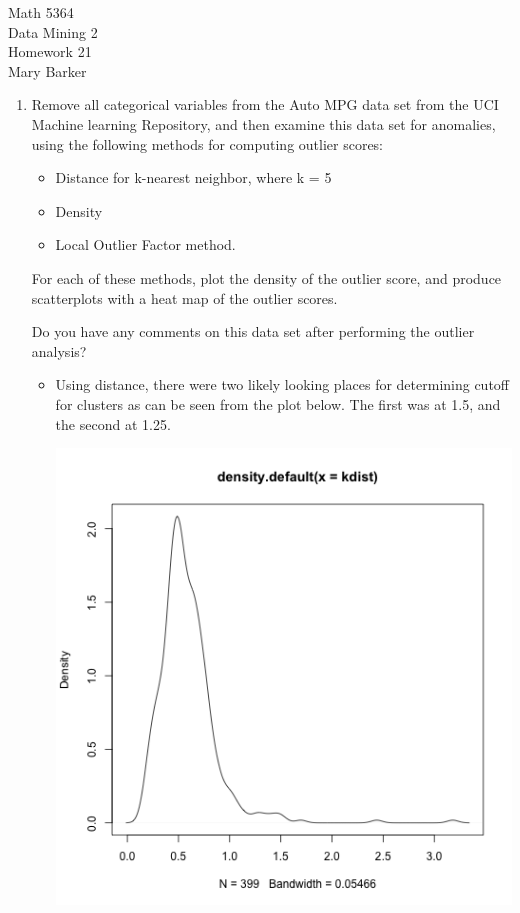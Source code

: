\documentclass[11pt]{article}
\begin{document}
\noindent\large{Math 5364}\\
\large{Data Mining 2}\\
\large{Homework 21}\\
\large{Mary Barker}
\doublespace

\begin{enumerate}
\item Remove all categorical variables from the Auto MPG data set from the 
UCI Machine learning Repository, and then examine this data set for anomalies, 
using the following methods for computing outlier scores: 

\begin{itemize}
\item Distance for k-nearest neighbor, where k = 5

\item Density

\item Local Outlier Factor method.
\end{itemize}
 For each of these methods, plot the density of the outlier score, and 
produce scatterplots with a heat map of the outlier scores.  

 Do you have any comments on this data set after performing the outlier analysis? 


\begin{itemize}
\item Using distance, there were two likely looking places for determining 
cutoff for clusters as can be seen from the plot below. The first was at 1.5, and 
the second at 1.25.

\begin{center}
\includegraphics[scale=0.35]{density_kdist}
\end{center}


\end{itemize}
\end{enumerate}
\end{document}
